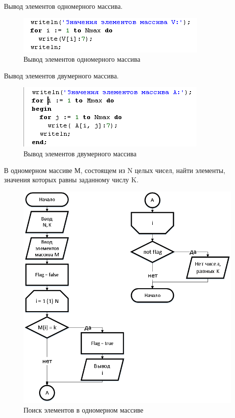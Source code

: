 \documentclass{beamer}
\begin{document}
\begin{frame}
Вывод элементов одномерного массива.
\begin{figure}[h]
\centering
\includegraphics[scale=1.0]{images/array_output_code_one.png}
\caption{Вывод элементов одномерного массива}
\label{pic-output-code-one}
\end{figure}

Вывод элементов двумерного массива.
\begin{figure}[h]
\centering
\includegraphics[scale=1.0]{images/array_output_code.png}
\caption{Вывод элементов двумерного массива}
\label{pic-output-code-two}
\end{figure}
\end{frame}

\begin{frame}
В одномерном массиве М, состоящем из N целых чисел, найти элементы, значения которых равны заданному числу K.
\begin{figure}[h]
\centering
\includegraphics[scale=0.35]{images/array_search.png}
\caption{Поиск элементов в одномерном массиве}
\label{pic-search}
\end{figure}
\end{frame}
\end{document}
